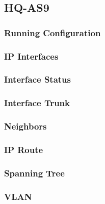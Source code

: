 \subsection{HQ-AS9}
\subsubsection{Running Configuration}


\subsubsection{IP Interfaces}


\subsubsection{Interface Status}


\subsubsection{Interface Trunk}


\subsubsection{Neighbors}


\subsubsection{IP Route}


\subsubsection{Spanning Tree}


\subsubsection{VLAN}




